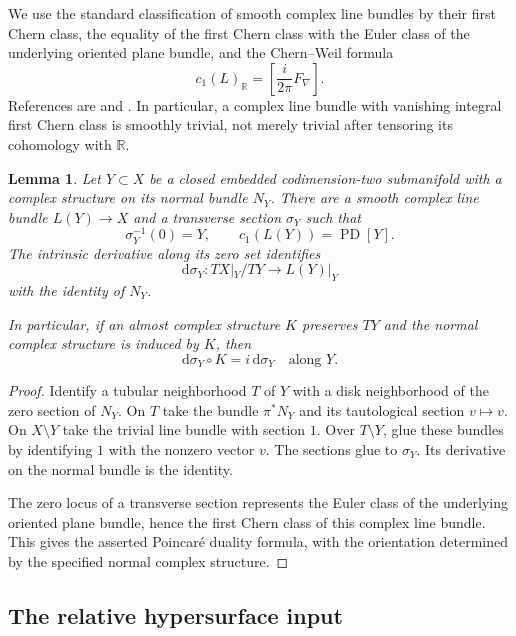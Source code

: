 \documentclass[11pt]{article}
\newtheorem{lemma}[theorem]{Lemma}
\theoremstyle{definition}
\theoremstyle{remark}
\newcommand{\R}{\mathbb R}
\newcommand{\dd}{\mathrm d}
\newcommand{\PD}{\operatorname{PD}}
\begin{document}
We use the standard classification of smooth complex line bundles by
their first Chern class, the equality of the first Chern class with
the Euler class of the underlying oriented plane bundle, and the
Chern--Weil formula
\[
c_1(L)_{\R}=\left[\frac{i}{2\pi}F_\nabla\right].
\]
References are \cite[Sections~9 and~14]{MS} and
\cite[Chapter~XII]{KN}.  In particular, a complex line bundle with
vanishing integral first Chern class is smoothly trivial, not merely
trivial after tensoring its cohomology with $\R$.

\begin{lemma}\label{lem:divisor-bundle}
Let $Y\subset X$ be a closed embedded codimension-two submanifold
with a complex structure on its normal bundle $N_Y$.  There are a
smooth complex line bundle $L(Y)\to X$ and a transverse section
$\sigma_Y$ such that
\[
\sigma_Y^{-1}(0)=Y,\qquad c_1(L(Y))=\PD[Y].
\]
The intrinsic derivative along its zero set identifies
\[
\dd\sigma_Y:TX|_Y/TY\longrightarrow L(Y)|_Y
\]
with the identity of $N_Y$.

In particular, if an almost complex structure $K$ preserves $TY$
and the normal complex structure is induced by $K$, then
\[
\dd\sigma_Y\circ K=i\,\dd\sigma_Y
\quad\text{along }Y.
\]
\end{lemma}

\begin{proof}
Identify a tubular neighborhood $T$ of $Y$ with a disk neighborhood
of the zero section of $N_Y$.  On $T$ take the bundle $\pi^*N_Y$
and its tautological section $v\mapsto v$.  On $X\setminus Y$
take the trivial line bundle with section $1$.  Over
$T\setminus Y$, glue these bundles by identifying $1$ with the
nonzero vector $v$.  The sections glue to $\sigma_Y$.
Its derivative on the normal bundle is the identity.

The zero locus of a transverse section represents the Euler class
of the underlying oriented plane bundle, hence the first Chern
class of this complex line bundle.  This gives the asserted
Poincar\'e duality formula, with the orientation determined by
the specified normal complex structure.
\end{proof}


\subsection{The relative hypersurface input}
\end{document}
